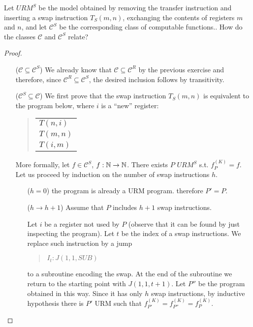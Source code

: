 \begin{exercise}
  Let $URM^S $ be the model obtained by removing the transfer
  instruction and inserting a swap instruction $ T_S(m,n) $,
  exchanging the contents of registers $m$ and $n$, and let $\mathcal{C}^S$ be the corresponding class of computable functions.. How do the classes $\mathcal{C}$ and $\mathcal{C}^S$ relate?
\begin{proof}
\begin{itemize}
  \item[($\mathcal{C} \subseteq \mathcal{C}^S$)]
  We already know that $\mathcal{C} \subseteq \mathcal{C}^R $ by the previous exercise and therefore, since $\mathcal{C}^R \subseteq \mathcal{C}^S$, the desired inclusion follows by transitivity.
  
  \item[($\mathcal{C}^S \subseteq \mathcal{C}$)]
  We first prove that the swap instruction $T_S (m, n)$ is equivalent to the program below, where $i$ is a ``new'' register:
  \begin{quote}
    \begin{tabular}{l}
    $T(n,i)$ \\
    $T(m,n)$ \\
    $T(i,m)$
    \end{tabular}
    \end{quote}

More formally, let $ f \in \mathcal{C}^S$, $f:\mathbb{N}\rightarrow \mathbb{N} $. There exists $P$
$URM^S $ s.t. $ f_P^{(K)} = f $. Let us proceed by induction on the
number of swap instructions $h$.
\begin{enumerate}
  \item[($h = 0$)] the program is already a URM program. therefore $P' = P$.
  \item[($h \rightarrow h+1$)] Assume that $P$ includes $h+1$ swap instructions. 

  Let $i$ be a register not used by $P$ (observe that it can be found by just inspecting the program). Let $t$ be the index of a swap instructions.
  We replace such instruction by a jump
  \begin{quote}
    $I_t : J (1,1, SUB)$
  \end{quote}
  to a subroutine encoding the swap. At the end of the subroutine we return to the starting point with $J (1,1, t + 1)$. Let $P''$ be the program obtained in this way. Since it has only $h$ swap instructions, by inductive hypothesis there is $P'$ URM such that $ f_{P'}^{(K)} = f_{P''}^{(K)} = f_{P}^{(K)}$.
  

\end{enumerate}
\end{itemize}
\end{proof}
\end{exercise}
